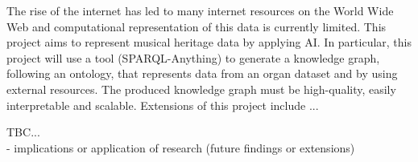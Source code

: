 The rise of the internet has led to many internet resources on the World Wide Web and computational representation of this data is currently limited. This project aims to represent musical heritage data by applying AI. In particular, this project will use a tool (SPARQL-Anything) to generate a knowledge graph, following an ontology, that represents data from an organ dataset and by using external resources. The produced knowledge graph must be high-quality, easily interpretable and scalable. Extensions of this project include ...

TBC...
\\- implications or application of research (future findings or extensions)